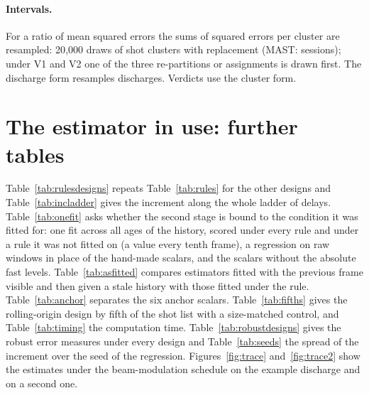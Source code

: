 \documentclass[11pt,a4paper]{article}
\begin{document}
\paragraph{Intervals.} For a ratio of mean squared errors the sums of squared errors per
cluster are resampled: 20{,}000 draws of shot clusters with replacement (MAST: sessions);
under V1 and V2 one of the three re-partitions or assignments is drawn first. The
discharge form resamples discharges. Verdicts use the cluster form.

\section{The estimator in use: further tables}
\label{sec:sstale}

Table~\ref{tab:rulesdesigns} repeats Table~\ref{tab:rules} for the other designs and
Table~\ref{tab:incladder} gives the increment along the whole ladder of delays.
Table~\ref{tab:onefit} asks whether the second stage is bound to the condition it was
fitted for: one fit across all ages of the history, scored under every rule and under a
rule it was not fitted on (a value every tenth frame), a regression on raw windows in
place of the hand-made scalars, and the scalars without the absolute fast levels.
Table~\ref{tab:asfitted} compares estimators fitted with the previous frame visible and
then given a stale history with those fitted under the rule. Table~\ref{tab:anchor}
separates the six anchor scalars. Table~\ref{tab:fifths} gives the rolling-origin design
by fifth of the shot list with a size-matched control, and Table~\ref{tab:timing} the
computation time. Table~\ref{tab:robustdesigns} gives the robust error measures under
every design and Table~\ref{tab:seeds} the spread of the increment over the seed of the
regression. Figures~\ref{fig:trace} and~\ref{fig:trace2} show the estimates under the
beam-modulation schedule on the example discharge and on a second one.

\begin{table}[tbp]
  \centering
  \caption{As Table~\ref{tab:rules} for the other three designs (target L5): fixed delays
  on the common rows, S on its own rows. The cost of staleness of S is taken against D10
  on the S rows. Intervals: 95\,\%, shot clusters resampled; bold: the interval excludes
  zero.}
  \label{tab:rulesdesigns}
  \TabRulesDesigns
\end{table}

\begin{table}[tbp]
  \centering
  \caption{\CapIncrementLadder}
  \label{tab:incladder}
  \TabIncrementLadder
\end{table}
\end{document}
